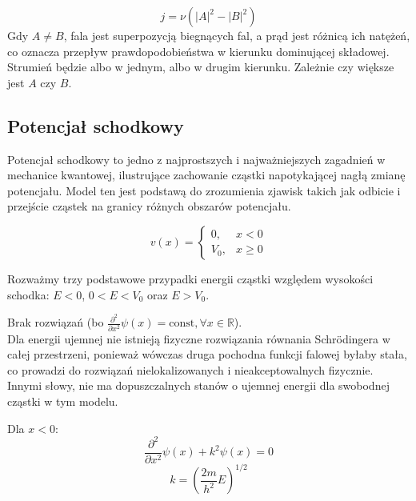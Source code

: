 \begin{equation*}
    j = \nu \left( \left| A \right|^2 - \left| B \right|^2 \right)
\end{equation*}
Gdy $A \neq B$, fala jest superpozycją biegnących fal, a prąd jest różnicą ich natężeń, co oznacza przepływ prawdopodobieństwa w kierunku dominującej składowej.
Strumień będzie albo w jednym, albo w drugim kierunku. Zależnie czy większe jest $A$ czy $B$. \\




\subsection{Potencjał schodkowy}

Potencjał schodkowy to jedno z najprostszych i najważniejszych zagadnień w mechanice kwantowej, ilustrujące zachowanie
cząstki napotykającej nagłą zmianę potencjału. Model ten jest podstawą do zrozumienia zjawisk takich jak odbicie i
przejście cząstek na granicy różnych obszarów potencjału.



\begin{equation*}
    v(x) = 
    \begin{cases}
        0, & x < 0 \\
        V_0, & x \geq 0
    \end{cases}
\end{equation*}

Rozważmy trzy podstawowe przypadki energii cząstki względem wysokości schodka: $E<0$, $0<E<V_0$ oraz $E>V_0$.


Brak rozwiązań (bo $\frac{\partial^2}{\partial x^2} \psi(x) = \text{const}, \forall x \in \mathbb{R}$). \\
Dla energii ujemnej nie istnieją fizyczne rozwiązania równania Schrödingera w całej przestrzeni,
ponieważ wówczas druga pochodna funkcji falowej byłaby stała, co prowadzi do rozwiązań nielokalizowanych i
nieakceptowalnych fizycznie. Innymi słowy, nie ma dopuszczalnych stanów o ujemnej energii dla swobodnej cząstki w tym modelu.


Dla $x < 0$:
\begin{equation*}
\frac{\partial^2}{\partial x^2} \psi(x) + k^2 \psi(x) = 0
\end{equation*}
%
\begin{equation*}
k = \left( \frac{2m}{h^2} E \right)^{1/2}
\end{equation*}


